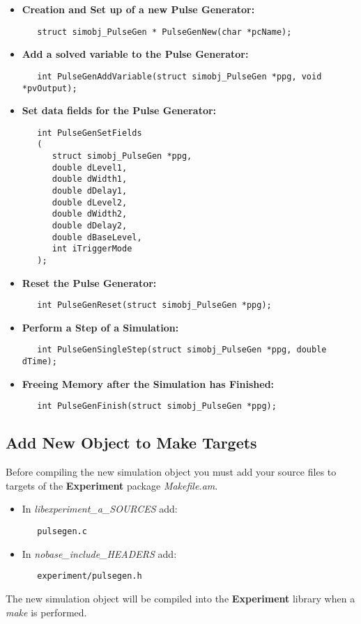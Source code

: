 \documentclass[12pt]{article}
\begin{document}
\begin{itemize}
\item {\bf Creation and Set up of a new Pulse Generator:}
\begin{verbatim}
   struct simobj_PulseGen * PulseGenNew(char *pcName);
\end{verbatim}

\item {\bf Add a solved variable to the Pulse Generator:}
\begin{verbatim}
   int PulseGenAddVariable(struct simobj_PulseGen *ppg, void *pvOutput);
\end{verbatim}

\item{\bf Set data fields for the Pulse Generator:}
\begin{verbatim}
   int PulseGenSetFields
   (
      struct simobj_PulseGen *ppg,
      double dLevel1,
      double dWidth1,
      double dDelay1,
      double dLevel2,
      double dWidth2,
      double dDelay2,
      double dBaseLevel,
      int iTriggerMode
   );
\end{verbatim}

\item {\bf Reset the Pulse Generator:}
\begin{verbatim}
   int PulseGenReset(struct simobj_PulseGen *ppg);
\end{verbatim}

\item {\bf Perform a Step of a Simulation:}
\begin{verbatim}
   int PulseGenSingleStep(struct simobj_PulseGen *ppg, double dTime);
\end{verbatim}

\item {\bf Freeing Memory after the Simulation has Finished:}
\begin{verbatim}
   int PulseGenFinish(struct simobj_PulseGen *ppg);
\end{verbatim}

\end{itemize}

\subsection*{Add New Object to Make Targets}

Before compiling the new simulation object you must add your source files to targets of the {\bf Experiment} package {\it Makefile.am}.

\begin{itemize}
   \item In {\it libexperiment\_a\_SOURCES} add:
\begin{verbatim}
   pulsegen.c
\end{verbatim}
   \item In {\it nobase\_include\_HEADERS} add:
\begin{verbatim}
   experiment/pulsegen.h 
\end{verbatim}
\end{itemize}
The new simulation object will be compiled into the {\bf Experiment} library when a {\it make} is performed.
\end{document}
